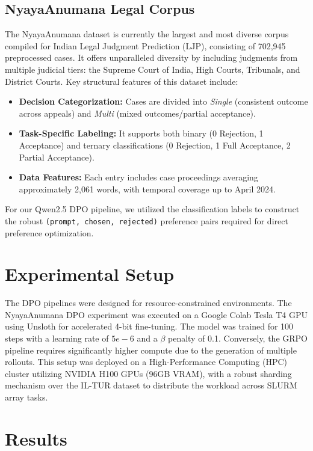 \documentclass[conference]{IEEEtran}
\begin{document}
\subsection{NyayaAnumana Legal Corpus \cite{nyayaanumana}}
The NyayaAnumana dataset is currently the largest and most diverse corpus compiled for Indian Legal Judgment Prediction (LJP), consisting of 702,945 preprocessed cases. It offers unparalleled diversity by including judgments from multiple judicial tiers: the Supreme Court of India, High Courts, Tribunals, and District Courts. 
Key structural features of this dataset include:
\begin{itemize}
    \item \textbf{Decision Categorization:} Cases are divided into \textit{Single} (consistent outcome across appeals) and \textit{Multi} (mixed outcomes/partial acceptance).
    \item \textbf{Task-Specific Labeling:} It supports both binary (0 Rejection, 1 Acceptance) and ternary classifications (0 Rejection, 1 Full Acceptance, 2 Partial Acceptance).
    \item \textbf{Data Features:} Each entry includes case proceedings averaging approximately 2,061 words, with temporal coverage up to April 2024.
\end{itemize}
For our Qwen2.5 DPO pipeline, we utilized the classification labels to construct the robust \texttt{(prompt, chosen, rejected)} preference pairs required for direct preference optimization.

\section{Experimental Setup}
The DPO pipelines were designed for resource-constrained environments. The NyayaAnumana DPO experiment was executed on a Google Colab Tesla T4 GPU using Unsloth for accelerated 4-bit fine-tuning. The model was trained for 100 steps with a learning rate of $5e-6$ and a $\beta$ penalty of 0.1.
Conversely, the GRPO pipeline requires significantly higher compute due to the generation of multiple rollouts. This setup was deployed on a High-Performance Computing (HPC) cluster utilizing NVIDIA H100 GPUs (96GB VRAM), with a robust sharding mechanism over the IL-TUR dataset to distribute the workload across SLURM array tasks.

\section{Results}
\end{document}
